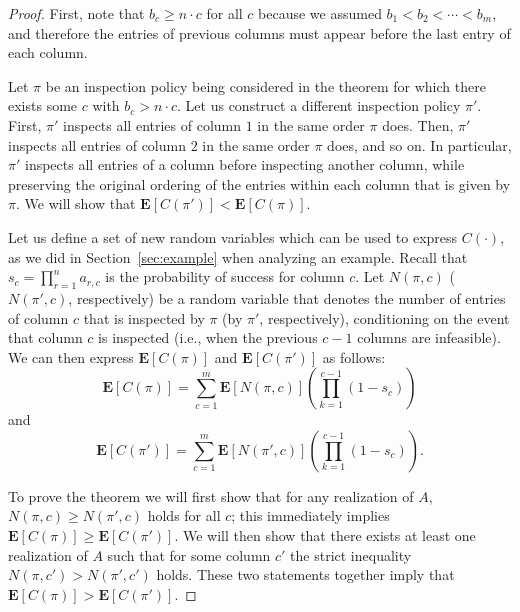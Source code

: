  \begin{proof}
 First, note that $b_c \geq n\cdot c$ for all $c$ because we assumed $b_1 < b_2 < \cdots < b_m$, and therefore the entries of previous columns must appear before the last entry of each column.

 Let $\pi$ be an inspection policy being considered in the theorem for which there exists some $c$ with $b_{c} > n \cdot c$.
 Let us construct a different inspection policy $\pi'$.
 First, $\pi'$ inspects all entries of column $1$ in the same order $\pi$ does. 
 Then, $\pi'$ inspects all entries of column $2$ in the same order $\pi$ does, and so on. 
 In particular, $\pi'$ inspects all entries of a column before inspecting another column, while preserving the original ordering of the entries within each column that is given by $\pi$. 
 We will show that $\mathbf{E}[C(\pi')] < \mathbf{E}[C(\pi)]$.

 Let us define a set of new random variables which can be used to express $C(\cdot)$, as we did in Section~\ref{sec:example} when analyzing an example.
 Recall that $s_c = \prod_{r=1}^{n} a_{r,c}$ is the probability of success for column $c$.
 Let $N(\pi, c)$ ($N(\pi', c)$, respectively) be a random variable that denotes the number of entries of column $c$ that is inspected by $\pi$ (by $\pi'$, respectively), conditioning on the event that column $c$ is inspected (i.e., when the previous $c-1$ columns are infeasible).
 We can then express $\mathbf{E}[C(\pi)]$ and $\mathbf{E}[C(\pi')]$ as follows:
 \begin{equation} \label{eqn:exp_c_pi_decoupled}
 	\mathbf{E}[C(\pi)] = \sum_{c=1}^{m} \mathbf{E}[N(\pi, c)]\left( \prod_{k=1}^{c-1} (1 - s_c) \right)
 \end{equation}
 and
 \begin{equation} \label{eqn:exp_c_pi2_decoupled}
 	\mathbf{E}[C(\pi')] = \sum_{c=1}^{m} \mathbf{E}[N(\pi', c)]\left( \prod_{k=1}^{c-1} (1 - s_c) \right).
 \end{equation}


 To prove the theorem we will first show that for any realization of $A$, $N(\pi, c) \geq N(\pi', c)$ holds for all $c$; this immediately implies $\mathbf{E}[C(\pi)] \geq \mathbf{E}[C(\pi')]$.
 We will then show that there exists at least one realization of $A$ such that for some column $c'$ the strict inequality $N(\pi, c') > N(\pi', c')$ holds. These two statements together imply that $\mathbf{E}[C(\pi)] > \mathbf{E}[C(\pi')]$.



\end{proof}
